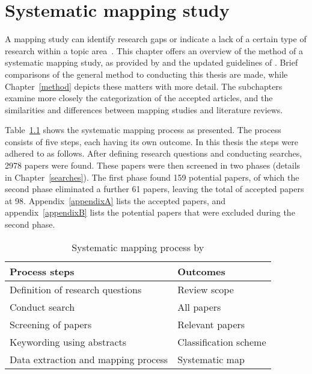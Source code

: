 \documentclass[utf8,english]{gradu3}
\begin{document}
\chapter{Systematic mapping study} \label{mapping}

A mapping study can identify research gaps or indicate a lack of a certain type
of research within a topic area~\parencite{petersen2008}.
This chapter offers an overview of the method of a systematic mapping study,
as provided by \textcite{petersen2008} and the updated guidelines of \textcite{petersen2015guidelines}.
Brief comparisons of the general method to conducting this thesis are made,
while Chapter~\ref{method} depicts these matters with more detail.
The subchapters examine more closely the categorization of the accepted articles,
and the similarities and differences between mapping studies and literature reviews.

Table~\ref{mappingtable} shows the systematic mapping process as \textcite{petersen2008} presented.
The process consists of five steps, each having its own outcome.
In this thesis the steps were adhered to as follows.
After defining research questions and conducting searches, 2978 papers were found.
These papers were then screened in two phases (details in Chapter~\ref{searches}).
The first phase found 159 potential papers, of which the second phase eliminated a further 61 papers,
leaving the total of accepted papers at 98. Appendix~\ref{appendixA} lists the accepted papers,
and appendix~\ref{appendixB} lists the potential papers that were excluded during the second phase.

\begin{table}[h]\centering
  \begin{tabular}{|p{6.5cm}|p{4cm}|}
    \hline
    \textbf{Process steps}              & \textbf{Outcomes}     \\ \hline
    Definition of research questions    & Review scope          \\ \hline
    Conduct search                      & All papers            \\ \hline
    Screening of papers                 & Relevant papers       \\ \hline
    Keywording using abstracts          & Classification scheme \\ \hline
    Data extraction and mapping process & Systematic map        \\ \hline
  \end{tabular}
  \caption{Systematic mapping process by \textcite{petersen2008}}
  \label{mappingtable}
\end{table}
\end{document}
